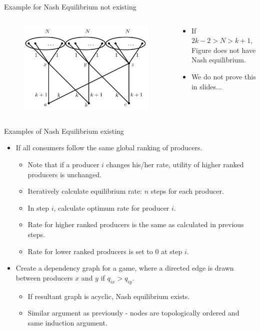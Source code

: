 \documentclass[aspectratio=169]{beamer}
\newcommand{\bi}{\begin{itemize}}
\newcommand{\ei}{\end{itemize}}
\begin{document}
\begin{frame}{Example for Nash Equilibrium not existing}
    \begin{columns}[T]
        \begin{column}{0.2\textwidth}
            \begin{figure}
                \includegraphics[scale=0.2]{./figures/follow_nash.png}
            \end{figure}
        \end{column}
        \begin{column}{0.2\textwidth}
            \pause
            \bi
        \item If $2k -2 > N > k + 1$, Figure does not have Nash equilibrium.
            \pause
        \item We do not prove this in slides...
            \ei
        \end{column}
    \end{columns}
\end{frame}

\begin{frame}{Examples of Nash Equilibrium existing}
    \bi
\item If all consumers follow the same global ranking of producers.
    \pause
    \bi
\item Note that if a producer $i$ changes his/her rate, utility of higher ranked producers
    is unchanged.
    \pause
\item Iteratively calculate equilibrium rate: $n$ steps for each producer.
    \pause
\item In step $i$, calculate optimum rate for producer $i$.
    \pause
\item Rate for higher ranked producers is the same as calculated in previous
    steps.
    \pause
\item Rate for lower ranked producers is set to 0 at step $i$.
    \ei
    \pause
\item Create a dependency graph for a game, where a directed edge is drawn between
    producers $x$ and $y$ if $q_{ix} > q_{iy}$.
    \pause
    \bi
\item If resultant graph is acyclic, Nash equilibrium exists.
    \pause
\item Similar argument as previously - nodes are topologically ordered and same
    induction argument.
    \ei
    \ei
\end{frame}
\end{document}

